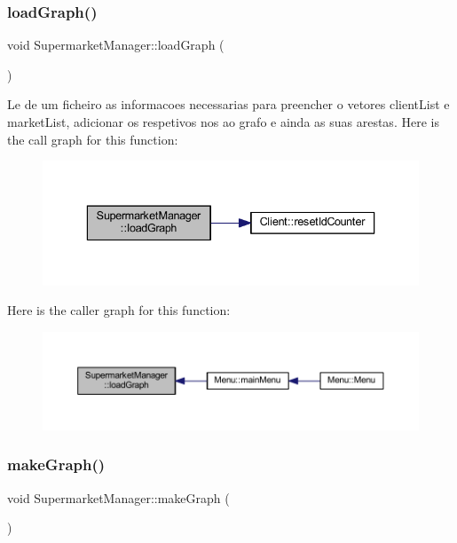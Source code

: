 \subsubsection{\texorpdfstring{load\+Graph()}{loadGraph()}}
{\footnotesize\ttfamily void Supermarket\+Manager\+::load\+Graph (\begin{DoxyParamCaption}{ }\end{DoxyParamCaption})}

Le de um ficheiro as informacoes necessarias para preencher o vetores client\+List e market\+List, adicionar os respetivos nos ao grafo e ainda as suas arestas. Here is the call graph for this function\+:
\nopagebreak
\begin{figure}[H]
\begin{center}
\leavevmode
\includegraphics[width=336pt]{class_supermarket_manager_a0072988df7db4459fe0a409894af51a4_cgraph}
\end{center}
\end{figure}
Here is the caller graph for this function\+:
\nopagebreak
\begin{figure}[H]
\begin{center}
\leavevmode
\includegraphics[width=350pt]{class_supermarket_manager_a0072988df7db4459fe0a409894af51a4_icgraph}
\end{center}
\end{figure}
\mbox{\label{class_supermarket_manager_abab275f63e6169a76efd92c90aaac0b4}} 
\subsubsection{\texorpdfstring{make\+Graph()}{makeGraph()}}
{\footnotesize\ttfamily void Supermarket\+Manager\+::make\+Graph (\begin{DoxyParamCaption}{ }\end{DoxyParamCaption})}

